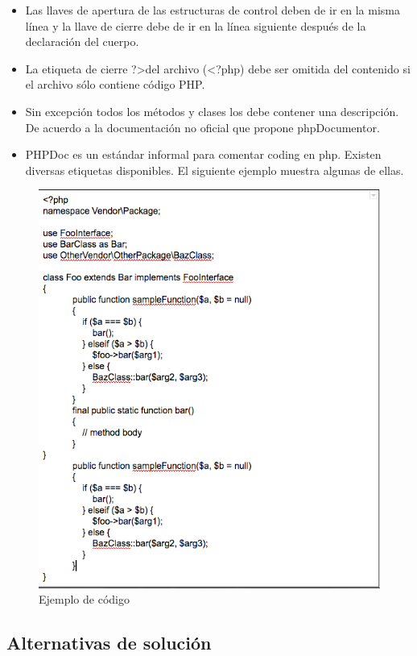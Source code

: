 \begin{itemize}
\begin{itemize}
\begin{itemize}
				\item Las llaves de apertura de las estructuras de control deben de ir en la misma línea y la llave de cierre debe de ir en la línea siguiente después de la declaración del cuerpo.

				\item La etiqueta de cierre ?\textgreater del archivo (\textless ?php) debe ser omitida del contenido si el archivo sólo contiene código PHP.
				
								
				\item Sin excepción todos los métodos y clases los debe contener una descripción. De acuerdo a la documentación no oficial que propone phpDocumentor.

				
				\item PHPDoc es un estándar informal para comentar coding en php. Existen diversas etiquetas disponibles. El siguiente ejemplo  muestra algunas de ellas.

			\end{itemize}
	\end{itemize}
\end{itemize}

\begin{figure}[htbp!]
		\centering
			\includegraphics[width=1\textwidth]{images/ejemploCodigo1}
		\caption{Ejemplo de código}
	\end{figure}

\subsection{Alternativas de solución}